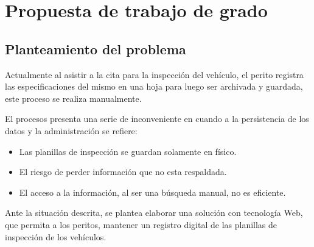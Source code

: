 \chapter{Propuesta de trabajo de grado}

\section{Planteamiento del problema}
\setlength{\parskip}{5mm}


Actualmente al asistir a la cita para la inspección del vehículo, el perito registra las especificaciones del mismo en una hoja para luego ser archivada y guardada, este proceso se realiza manualmente.

El procesos presenta una serie de inconveniente en cuando a la persistencia de los datos y la administración se refiere:

\begin{itemize}

	\item Las planillas de inspección se guardan solamente en físico.

	\item El riesgo de perder información que no esta respaldada.

	\item El acceso a la información, al ser una búsqueda manual, no es eficiente. 

\end{itemize}


Ante la situación descrita, se plantea elaborar una solución con tecnología Web, que permita a los peritos, mantener un registro digital de las planillas de inspección de los vehículos.







